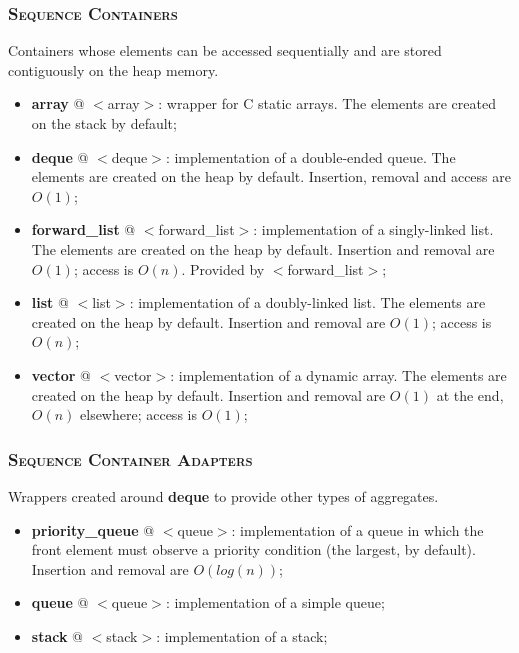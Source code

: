 \documentclass[10pt]{article}
\begin{document}
\begin{multicols*}{4}
{\subsubsection*{\textsc{Sequence Containers}} 
\noindent
Containers whose elements can be accessed sequentially and are stored contiguously on the heap memory.

\begin{itemize}[leftmargin=*,topsep=0.25pt]
  \setlength\itemsep{-1.8pt}
	\item \textbf{array} @ $<$array$>$: wrapper for C static arrays. The elements are created on the stack by default;
	\item \textbf{deque} @ $<$deque$>$: implementation of a double-ended queue. The elements are created on the heap by default. Insertion, removal and access are $O(1)$;
	\item \textbf{forward\_list} @ $<$forward\_list$>$: implementation of a singly-linked list. The elements are created on the heap by default. Insertion and removal are $O(1)$; access is $O(n)$. Provided by $<$forward\_list$>$;  
	\item \textbf{list} @ $<$list$>$: implementation of a doubly-linked list. The elements are created on the heap by default. Insertion and removal are $O(1)$; access is $O(n)$;
	\item \textbf{vector} @ $<$vector$>$: implementation of a dynamic array. The elements are created on the heap by default. Insertion and removal are $O(1)$ at the end, $O(n)$ elsewhere; access is $O(1)$;
\end{itemize}

\subsubsection*{\textsc{Sequence Container Adapters}} 
\noindent
Wrappers created around \textbf{deque} to provide other types of aggregates.

\begin{itemize}[leftmargin=*,topsep=0.25pt]
  \setlength\itemsep{-1.8pt}
	\item \textbf{priority\_queue} @ $<$queue$>$: implementation of a queue in which the front element must observe a priority condition (the largest, by default). Insertion and removal are $O(log(n))$;
	\item \textbf{queue} @ $<$queue$>$: implementation of a simple queue;
	\item \textbf{stack} @ $<$stack$>$: implementation of a stack;
\end{itemize}
\noindent

}
\end{multicols*}
\end{document}
